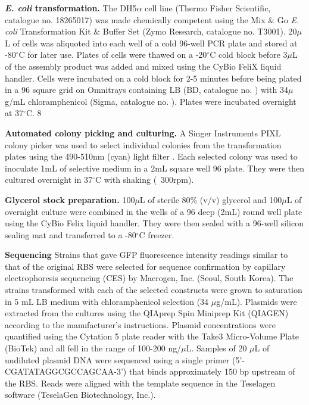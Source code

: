 \textbf{\textit{E. coli} transformation.}
The DH5$\alpha$ cell line (Thermo Fisher Scientific, catalogue no. 18265017) was made chemically competent using the Mix $\&$ Go \textit{E. coli} Transformation Kit $\&$ Buffer Set (Zymo Research, catalogue no. T3001).
20$\mu$L of cells was aliquoted into each well of a cold 96-well PCR plate and stored at -80$^{\circ}$C for later use.
Plates of cells were thawed on a -20$^{\circ}$C cold block before 3$\mu$L of the assembly product was added and mixed using the CyBio FeliX liquid handler.
Cells were incubated on a cold block for 2-5 minutes before being plated in a 96 square grid on Omnitrays containing LB (BD, catalogue no. \mengyan{***}) with 34$\mu$g/mL chloramphenicol (Sigma, catalogue no. \mengyan{***}).
Plates were incubated overnight at 37$^{\circ}$C. 
8


\textbf{Automated colony picking and culturing.}
A Singer Instruments PIXL colony picker was used to select individual colonies from the transformation plates using the 490-510nm (cyan) light filter .
Each selected colony was used to inoculate 1mL of selective medium in a 2mL square well 96 plate.
They were then cultured overnight in 37$^{\circ}$C with shaking (~300rpm).

\textbf{Glycerol stock preparation.}
100$\mu$L of sterile 80\% (v/v) glycerol and 100$\mu$L of overnight culture were combined in the wells of a 96 deep (2mL) round well plate using the CyBio Felix liquid handler.
They were then sealed with a 96-well silicon sealing mat and transferred to a -80$^{\circ}$C freezer. 

\textbf{Sequencing}
Strains that gave GFP fluorescence intensity readings similar to that of the original RBS were selected for sequence confirmation by capillary electrophoresis sequencing (CES) by Macrogen, Inc. (Seoul, South Korea).
The strains transformed with each of the selected constructs were grown to saturation in 5 mL LB medium with chloramphenicol selection (34 $\mu$g/mL).
Plasmids were extracted from the cultures using the QIAprep Spin Miniprep Kit (QIAGEN) according to the manufacturer's instructions.
Plasmid concentrations were quantified using the Cytation 5 plate reader with the Take3 Micro-Volume Plate (BioTek) and all fell in the range of 100-200 ng/$\mu$L.
Samples of 20 $\mu$L of undiluted plasmid DNA were sequenced using a single primer (5'-CGATATAGGCGCCAGCAA-3') that binds approximately 150 bp upstream of the RBS.
Reads were aligned with the template sequence in the Teselagen software (TeselaGen Biotechnology, Inc.).

